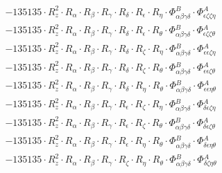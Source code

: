 \documentclass{article}
\begin{document}
\begin{subequations}
\begin{gather}
\begin{array}{c}
 \\[0.2em] 		 - 135135 \cdot R_{z}^{2} \cdot R_{\alpha{}} \cdot R_{\beta{}} \cdot R_{\gamma{}} \cdot R_{\delta{}} \cdot R_{\epsilon{}} \cdot R_{\eta{}} \cdot \Phi{}^{B}_{\alpha{}\beta{}\gamma{}\delta{}} \cdot \Phi{}^{A}_{\epsilon{}\zeta{}\zeta{}\eta{}} 
 \\[0.2em] 		 - 135135 \cdot R_{z}^{2} \cdot R_{\alpha{}} \cdot R_{\beta{}} \cdot R_{\gamma{}} \cdot R_{\delta{}} \cdot R_{\epsilon{}} \cdot R_{\theta{}} \cdot \Phi{}^{B}_{\alpha{}\beta{}\gamma{}\delta{}} \cdot \Phi{}^{A}_{\epsilon{}\zeta{}\zeta{}\theta{}} 
 \\[0.2em] 		 - 135135 \cdot R_{z}^{2} \cdot R_{\alpha{}} \cdot R_{\beta{}} \cdot R_{\gamma{}} \cdot R_{\delta{}} \cdot R_{\zeta{}} \cdot R_{\eta{}} \cdot \Phi{}^{B}_{\alpha{}\beta{}\gamma{}\delta{}} \cdot \Phi{}^{A}_{\epsilon{}\epsilon{}\zeta{}\eta{}} 
 \\[0.2em] 		 - 135135 \cdot R_{z}^{2} \cdot R_{\alpha{}} \cdot R_{\beta{}} \cdot R_{\gamma{}} \cdot R_{\delta{}} \cdot R_{\zeta{}} \cdot R_{\theta{}} \cdot \Phi{}^{B}_{\alpha{}\beta{}\gamma{}\delta{}} \cdot \Phi{}^{A}_{\epsilon{}\epsilon{}\zeta{}\theta{}} 
 \\[0.2em] 		 - 135135 \cdot R_{z}^{2} \cdot R_{\alpha{}} \cdot R_{\beta{}} \cdot R_{\gamma{}} \cdot R_{\delta{}} \cdot R_{\eta{}} \cdot R_{\theta{}} \cdot \Phi{}^{B}_{\alpha{}\beta{}\gamma{}\delta{}} \cdot \Phi{}^{A}_{\epsilon{}\epsilon{}\eta{}\theta{}} 
 \\[0.2em] 		 - 135135 \cdot R_{z}^{2} \cdot R_{\alpha{}} \cdot R_{\beta{}} \cdot R_{\gamma{}} \cdot R_{\epsilon{}} \cdot R_{\zeta{}} \cdot R_{\eta{}} \cdot \Phi{}^{B}_{\alpha{}\beta{}\gamma{}\delta{}} \cdot \Phi{}^{A}_{\delta{}\epsilon{}\zeta{}\eta{}} 
 \\[0.2em] 		 - 135135 \cdot R_{z}^{2} \cdot R_{\alpha{}} \cdot R_{\beta{}} \cdot R_{\gamma{}} \cdot R_{\epsilon{}} \cdot R_{\zeta{}} \cdot R_{\theta{}} \cdot \Phi{}^{B}_{\alpha{}\beta{}\gamma{}\delta{}} \cdot \Phi{}^{A}_{\delta{}\epsilon{}\zeta{}\theta{}} 
 \\[0.2em] 		 - 135135 \cdot R_{z}^{2} \cdot R_{\alpha{}} \cdot R_{\beta{}} \cdot R_{\gamma{}} \cdot R_{\epsilon{}} \cdot R_{\eta{}} \cdot R_{\theta{}} \cdot \Phi{}^{B}_{\alpha{}\beta{}\gamma{}\delta{}} \cdot \Phi{}^{A}_{\delta{}\epsilon{}\eta{}\theta{}} 
 \\[0.2em] 		 - 135135 \cdot R_{z}^{2} \cdot R_{\alpha{}} \cdot R_{\beta{}} \cdot R_{\gamma{}} \cdot R_{\zeta{}} \cdot R_{\eta{}} \cdot R_{\theta{}} \cdot \Phi{}^{B}_{\alpha{}\beta{}\gamma{}\delta{}} \cdot \Phi{}^{A}_{\delta{}\zeta{}\eta{}\theta{}} 

\end{array}
\end{gather}
\end{subequations}
\end{document}
